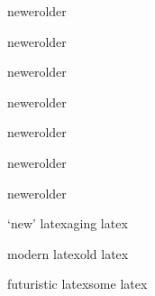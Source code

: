  newer\else older\fi

 newer\else older\fi

 newer\else older\fi

 newer\else older\fi

 newer\else older\fi

 newer\else older\fi

 newer\else older\fi

 `new' latex\else aging latex\fi

 modern latex\else old latex\fi

 futuristic latex\else some latex\fi
